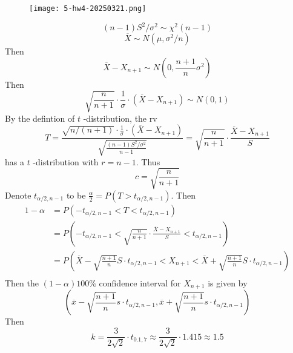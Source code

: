 \begin{figure}[H]
\centering
\texttt{[image: 5-hw4-20250321.png]}
\label{}
\end{figure}
\[
(n-1)S^{2}/\sigma^{2}\sim \chi^{2}(n-1)
\]
\[
\overline{X}\sim N(\mu,\sigma^{2}/n)
\]
Then
\[
\overline{X}-X_{n+1}\sim N\left( 0,\frac{n+1}{n}\sigma^{2} \right)
\]
Then
\[
\sqrt{ \frac{n}{n+1} }\cdot\frac{1}{\sigma}\cdot (\overline{X}-X_{n+1})\sim N(0,1)
\]
By the defintion of $t$ -distribution, the rv
\[
T=\frac{\sqrt{ n/(n+1) }\cdot\frac{1}{\sigma}\cdot (\overline{X}-X_{n+1})}{\sqrt{ \frac{(n-1)S^{2}/\sigma^{2}}{n-1} }}=\sqrt{ \frac{n}{n+1}  }\cdot\frac{\overline{X}-X_{n+1}}{S}
\]
has a $t$ -distribution with $r=n-1$. Thus
\[
c=\sqrt{ \frac{n}{n+1}  }
\]
Denote $t_{\alpha/2,n-1}$ to be $\frac{\alpha}{2}=P(T>t_{\alpha/2,n-1})$. Then
\[
\begin{aligned}
1-\alpha & =P(-t_{\alpha/2,n-1}<T<t_{\alpha/2,n-1} )  \\
 & =P\left( -t_{\alpha/2,n-1}<\sqrt{ \frac{n}{n+1}  }\cdot\frac{\overline{X}-X_{n+1}}{S}<t_{\alpha/2,n-1} \right) \\
 & =P\left( \overline{X}-\sqrt{ \frac{n+1}{n} }S\cdot t_{\alpha/2,n-1}<X_{n+1}< \overline{X}+\sqrt{ \frac{n+1}{n} }S\cdot t_{\alpha/2,n-1} \right) \\
\end{aligned}
\]
Then the $(1-\alpha) 100\%$ confidence interval for $X_{n+1}$ is given by
\[
\left( \overline{x}-\sqrt{ \frac{n+1}{n} }s\cdot t_{\alpha/2,n-1} ,\overline{x}+\sqrt{ \frac{n+1}{n} }s\cdot t_{\alpha/2,n-1}\right)
\]
Then
\[
k=\frac{3}{2\sqrt{ 2 }}\cdot t_{0.1,7}\approx\frac{3}{2\sqrt{ 2 }}\cdot1.415\approx1.5
\]